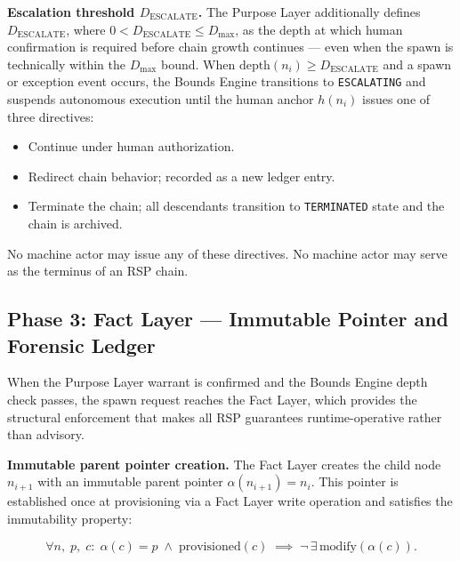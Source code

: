 \medskip
\noindent\textbf{Escalation threshold $D_{\text{ESCALATE}}$.} The Purpose Layer additionally defines $D_{\text{ESCALATE}}$, where $0 < D_{\text{ESCALATE}} \leq D_{\max}$, as the depth at which human confirmation is required before chain growth continues — even when the spawn is technically within the $D_{\max}$ bound. When $\text{depth}(n_i) \geq D_{\text{ESCALATE}}$ and a spawn or exception event occurs, the Bounds Engine transitions to \texttt{ESCALATING} and suspends autonomous execution until the human anchor $h(n_i)$ issues one of three directives:

\begin{itemize}
    \item[\texttt{ACK}] Continue under human authorization.
    \item[\texttt{RESOLVE}] Redirect chain behavior; recorded as a new ledger entry.
    \item[\texttt{REJECT}] Terminate the chain; all descendants transition to \texttt{TERMINATED} state and the chain is archived.
\end{itemize}

No machine actor may issue any of these directives. No machine actor may serve as the terminus of an RSP chain.

\subsection{Phase 3: Fact Layer — Immutable Pointer and Forensic Ledger}
\label{sec:rs-phase3}

When the Purpose Layer warrant is confirmed and the Bounds Engine depth check passes, the spawn request reaches the Fact Layer, which provides the structural enforcement that makes all RSP guarantees runtime-operative rather than advisory.

\medskip
\noindent\textbf{Immutable parent pointer creation.} The Fact Layer creates the child node $n_{i+1}$ with an immutable parent pointer $\alpha(n_{i+1}) = n_i$. This pointer is established once at provisioning via a Fact Layer write operation and satisfies the immutability property:

\begin{equation}
\forall n,\; p,\; c:\;
\alpha(c) = p \;\land\; \text{provisioned}(c)
\;\implies\;
\neg\,\exists\,\text{modify}(\alpha(c)).
\label{eq:rs-pointer-immutability}
\end{equation}

